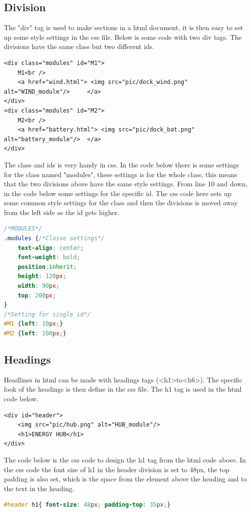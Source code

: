 \subsection{Division}
The "div" tag is used to make sections in a html document, it is then easy to set up some style settings in the css file. Below is some code with two div tags. The divisions have the same class but two different ids.
\begin{lstlisting}
<div class="modules" id="M1">		
	M1<br />
	<a href="wind.html"> <img src="pic/dock_wind.png"		alt="WIND_module"/> 	</a>
</div>
<div class="modules" id="M2">
	M2<br />
	<a href="battery.html"> <img src="pic/dock_bat.png" 	alt="battery_module"/>	</a>
</div>
\end{lstlisting}
The class and ids is very handy in css. In the code below there is some settings for the class named "modules", these settings is for the whole class, this means that the two divisions above have the same style settings. From line 10 and down, in the code below some settings for the specific id. The css code here sets up some common style settings for the class and then the divisions is moved away from the left side as the id gets higher.
\begin{lstlisting}[language=CSS]
/*MODULES*/
.modules {/*Classe settings*/
	text-align: center;
	font-weight: bold;
	position:inherit;
	height: 120px;
	width: 90px;
	top: 200px;
}
/*Setting for single id*/
#M1	{left: 10px;}
#M2	{left: 100px;}
\end{lstlisting}

\subsection{Headings}
Headlines in html can be made with headings tags (\textless h1\textgreater  to\textless h6\textgreater). The specific look of the headings is then define in the css file. The h1 tag is used in the html code below.
\begin{lstlisting}
<div id="header">
	<img src="pic/hub.png" alt="HUB_module"/>
	<h1>ENERGY HUB</h1>
</div>
\end{lstlisting}
The code below is the css code to design the h1 tag from the html code above. In the css code the font size of h1 in the header division is set to 48px, the top padding is also set, which is the space from the element above the heading and to the text in the heading.
\begin{lstlisting}[language=CSS]
#header h1{ font-size: 48px; padding-top: 35px;}
\end{lstlisting}

